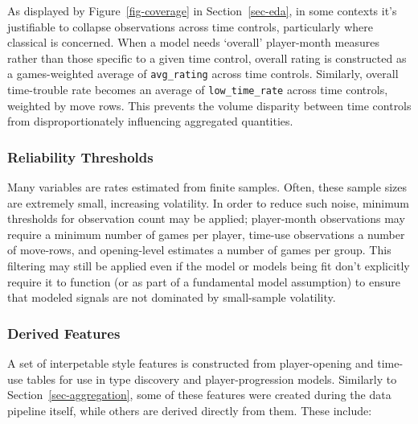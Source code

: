 \documentclass[
  12pt]{article}
\begin{document}
As displayed by Figure~\ref{fig-coverage} in Section~\ref{sec-eda}, in
some contexts it's justifiable to collapse observations across time
controls, particularly where classical is concerned. When a model needs
`overall' player-month measures rather than those specific to a given
time control, overall rating is constructed as a games-weighted average
of \texttt{avg\_rating} across time controls. Similarly, overall
time-trouble rate becomes an average of \texttt{low\_time\_rate} across
time controls, weighted by move rows. This prevents the volume disparity
between time controls from disproportionately influencing aggregated
quantities.

\subsubsection{Reliability Thresholds}\label{reliability-thresholds}

Many variables are rates estimated from finite samples. Often, these
sample sizes are extremely small, increasing volatility. In order to
reduce such noise, minimum thresholds for observation count may be
applied; player-month observations may require a minimum number of games
per player, time-use observations a number of move-rows, and
opening-level estimates a number of games per group. This filtering may
still be applied even if the model or models being fit don't explicitly
require it to function (or as part of a fundamental model assumption) to
ensure that modeled signals are not dominated by small-sample
volatility.

\subsubsection{Derived Features}\label{derived-features}

A set of interpetable style features is constructed from player-opening
and time-use tables for use in type discovery and player-progression
models. Similarly to Section~\ref{sec-aggregation}, some of these
features were created during the data pipeline itself, while others are
derived directly from them. These include:
\end{document}
